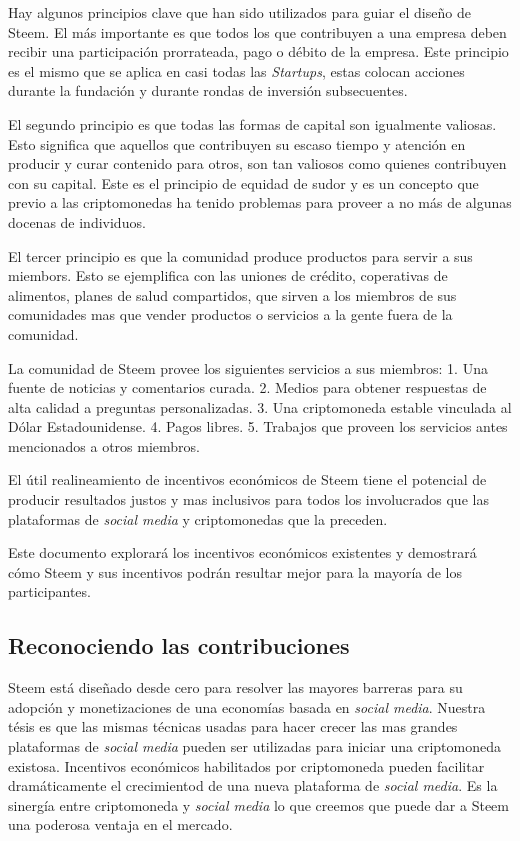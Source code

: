 \documentclass[a4paper,titlepage,final]{article}
\begin{document}
Hay algunos principios clave que han sido utilizados para guiar el diseño de Steem. El más importante es que todos los que contribuyen a una empresa deben recibir una participación prorrateada, pago o débito de la empresa. Este principio es el mismo que se aplica en casi todas las \textit{Startups}, estas colocan acciones durante la fundación y durante rondas de inversión subsecuentes.

El segundo principio es que todas las formas de capital son igualmente valiosas. Esto significa que aquellos que contribuyen su escaso tiempo y atención en producir y curar contenido para otros, son tan valiosos como quienes contribuyen con su capital. Este es el principio de equidad de sudor\cite{2} y es un concepto que previo a las criptomonedas ha tenido problemas para proveer a no más de algunas docenas de individuos.

El tercer principio es que la comunidad produce productos para servir a sus miembors. Esto se ejemplifica con las uniones de crédito, coperativas de alimentos, planes de salud compartidos, que sirven a los miembros de sus comunidades mas que vender productos o servicios a la gente fuera de la comunidad.

La comunidad de Steem provee los siguientes servicios a sus miembros: 1. Una fuente de noticias y comentarios curada. 2. Medios para obtener respuestas de alta calidad a preguntas personalizadas. 3. Una criptomoneda estable vinculada al Dólar Estadounidense. 4. Pagos libres. 5. Trabajos que proveen los servicios antes mencionados a otros miembros.

El útil realineamiento de incentivos económicos de Steem tiene el potencial de producir resultados justos y mas inclusivos para todos los involucrados que las plataformas de \textit{social media} y criptomonedas que la preceden.

Este documento explorará los incentivos económicos existentes y demostrará cómo Steem y sus incentivos podrán resultar mejor para la mayoría de los participantes.

\subsection{Reconociendo las contribuciones}
Steem está diseñado desde cero para resolver las mayores barreras para su adopción y monetizaciones de una economías basada en \textit{social media}. Nuestra tésis es que las mismas técnicas usadas para hacer crecer las mas grandes plataformas de \textit{social media} pueden ser utilizadas para iniciar una criptomoneda existosa. Incentivos económicos habilitados por criptomoneda pueden facilitar dramáticamente el crecimientod de una nueva plataforma de \textit{social media}. Es la sinergía entre criptomoneda y \textit{social media} lo que creemos que puede dar a Steem una poderosa ventaja en el mercado.
\end{document}
